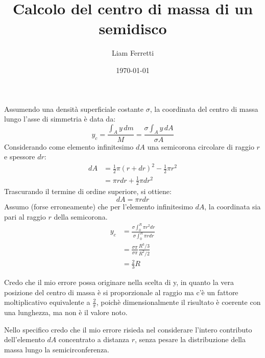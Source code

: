 \documentclass[11pt, a4paper]{article}
\title{Calcolo del centro di massa di un semidisco}
\author{Liam Ferretti}
\date{\today}
\begin{document}
\maketitle


Assumendo una densità superficiale costante $\sigma$, la coordinata del centro di massa lungo l'asse di simmetria è data da:
\begin{equation}
    y_c = \frac{\int_{A} y \, dm}{M} = \frac{\sigma \int_{A} y \, dA}{\sigma A}
\end{equation}
Considerando come elemento infinitesimo $dA$ una semicorona circolare di raggio $r$ e spessore $dr$:
\begin{align}
    dA & = \frac{1}{2}\pi(r + dr)^2 - \frac{1}{2}\pi r^2 \\
    & = \pi rdr + \frac{1}{2}\pi dr^2
\end{align}
Trascurando il termine di ordine superiore, si ottiene:
\begin{equation}
    dA = \pi rdr
\end{equation}
Assumo (forse erroneamente) che per l'elemento infinitesimo $dA$, la coordinata sia pari al raggio $r$ della semicorona.
\begin{align}
    y_c & = \frac{\sigma \int_{0}^{R} \pi r^2dr}{\sigma \int_{0}^{R} \pi rdr} \\
    & = \frac{\sigma \pi}{\sigma \pi} \frac{R^3/3}{R^2/2} \\
    & = \frac{2}{3}R
\end{align}

Credo che il mio errore possa originare nella scelta di y, in quanto la vera posizione del centro di massa è si proporzionale al raggio ma c'è un fattore moltiplicativo equivalente a $\frac{2}{\pi}$, poichè dimensionalmente il risultato è coerente con una lunghezza, ma non è il valore noto.

Nello specifico credo che il mio errore risieda nel considerare l'intero contributo dell'elemento $dA$ concentrato a distanza $r$, senza pesare la distribuzione della massa lungo la semicirconferenza.
\end{document}
